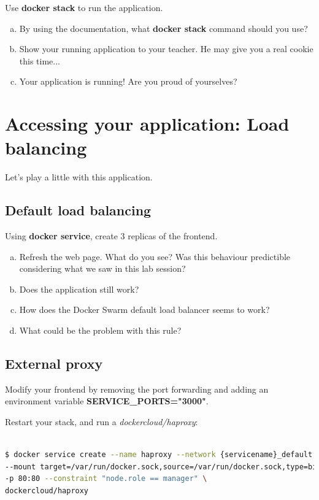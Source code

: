 \documentclass[a4paper,11pt]{exam}
\begin{document}
Use \textbf{docker stack} to run the application.

\begin{questions}
	\question 
	\begin{enumerate}[(a)]
		\item By using the documentation, what \textbf{docker stack} command should you use?
		\item Show your running application to your teacher. He may give you a real cookie this time...
		\item Your application is running! Are you proud of yourselves?
	\end{enumerate}
\end{questions}

\section{Accessing your application: Load balancing}

Let's play a little with this application. 
\subsection{Default load balancing}
\begin{questions}
	\question Using \textbf{docker service}, create 3 replicas of the frontend.
	\begin{enumerate}[(a)]
		\item Refresh the web page. What do you see? Was this behaviour predictible considering what we saw in this lab session?
		\item Does the application still work?
		\item How does the Docker Swarm default load balancer seems to work?
		\item What could be the problem with this rule?
	\end{enumerate}
\end{questions}

\subsection{External proxy}

Modify your frontend by removing the port forwarding and adding an environment variable \textbf{SERVICE\_PORTS="3000"}.

Restart your stack, and run a \textit{dockercloud/haproxy}:
\begin{lstlisting}[frame=single,language={sh}]  % Start your code-block

$ docker service create --name haproxy --network {servicename}_default \
--mount target=/var/run/docker.sock,source=/var/run/docker.sock,type=bind \
-p 80:80 --constraint "node.role == manager" \
dockercloud/haproxy

\end{lstlisting}
\end{document}
